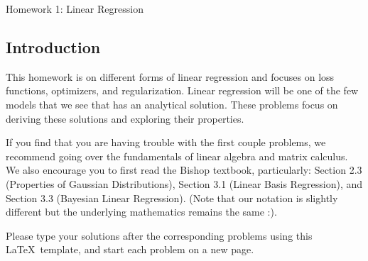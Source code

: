 \documentclass[submit]{harvardml}
\begin{document}
	\begin{center}
		{\Large Homework 1: Linear Regression}\\
	\end{center}
	
	
	
	\subsection*{Introduction}
	This homework is on different forms of linear regression and focuses
	on loss functions, optimizers, and regularization. Linear regression 
	will be one of the few models that we see that has an analytical solution.
	These problems focus on deriving these solutions and exploring their 
	properties. 
	
	If you find that you are having trouble with the first couple
	problems, we recommend going over the fundamentals of linear algebra
	and matrix calculus. We also encourage you to first read the Bishop
	textbook, particularly: Section 2.3 (Properties of Gaussian
	Distributions), Section 3.1 (Linear Basis Regression), and Section 3.3
	(Bayesian Linear Regression). (Note that our notation is slightly different but
	the underlying mathematics remains the same :).
	
	Please type your solutions after the corresponding problems using this \LaTeX\ template, and start each problem on a new page.\\
	
	\pagebreak 
	
\end{document}
